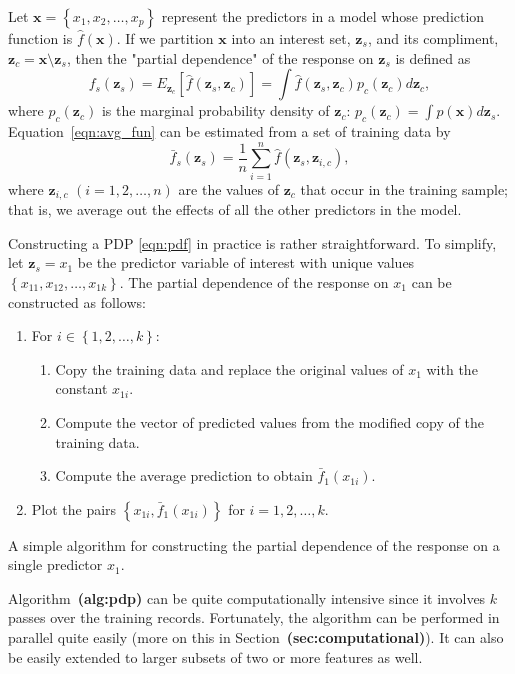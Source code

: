 \documentclass{article}
\def\ref#1{\textbf{(#1)}}
\begin{document}
Let $\boldsymbol{x} = \left\{x_1, x_2, \dots, x_p\right\}$ represent the predictors in a model whose prediction function is $\widehat{f}\left(\boldsymbol{x}\right)$. If we partition $\boldsymbol{x}$ into an interest set, $\boldsymbol{z}_s$, and its compliment, $\boldsymbol{z}_c = \boldsymbol{x} \setminus \boldsymbol{z}_s$, then the "partial dependence" of the response on $\boldsymbol{z}_s$ is defined as
\begin{equation}
\label{eqn:avg_fun}
  f_s\left(\boldsymbol{z}_s\right) = E_{\boldsymbol{z}_c}\left[\widehat{f}\left(\boldsymbol{z}_s, \boldsymbol{z}_c\right)\right] = \int \widehat{f}\left(\boldsymbol{z}_s, \boldsymbol{z}_c\right)p_{c}\left(\boldsymbol{z}_c\right)d\boldsymbol{z}_c,
\end{equation}
where $p_{c}\left(\boldsymbol{z}_c\right)$ is the marginal probability density of $\boldsymbol{z}_c$: $p_{c}\left(\boldsymbol{z}_c\right) = \int p\left(\boldsymbol{x}\right)d\boldsymbol{z}_s$.
Equation~\eqref{eqn:avg_fun} can be estimated from a set of training data by
\begin{equation}
\label{eqn:pdf}
\bar{f}_s\left(\boldsymbol{z}_s\right) = \frac{1}{n}\sum_{i = 1}^n\widehat{f}\left(\boldsymbol{z}_s,\boldsymbol{z}_{i, c}\right),
\end{equation}
where $\boldsymbol{z}_{i, c}$ $\left(i = 1, 2, \dots, n\right)$ are the values of $\boldsymbol{z}_c$ that occur in the training sample; that is, we average out the effects of all the other predictors in the model.

Constructing a PDP \eqref{eqn:pdf} in practice is rather straightforward. To simplify, let $\boldsymbol{z}_s = x_1$ be the predictor variable of interest with unique values $\left\{x_{11}, x_{12}, \dots, x_{1k}\right\}$. The partial dependence of the response on $x_1$ can be constructed as follows:

\begin{algorithm}
\begin{enumerate}
  \item For $i \in \left\{1, 2, \dots, k\right\}$:
  \begin{enumerate}
    \item Copy the training data and replace the original values of $x_1$ with the constant $x_{1i}$.
    \item Compute the vector of predicted values from the modified copy of the training data.
    \item Compute the average prediction to obtain $\bar{f}_1\left(x_{1i}\right)$.
  \end{enumerate}
  \item Plot the pairs $\left\{x_{1i}, \bar{f}_1\left(x_{1i}\right)\right\}$ for $i = 1, 2, \dotsc, k$.
\end{enumerate}
\caption{A simple algorithm for constructing the partial dependence of the response on a single predictor $x_1$. \label{alg:pdp}}
\end{algorithm}
Algorithm~\ref{alg:pdp} can be quite computationally intensive since it involves $k$ passes over the training records. Fortunately, the algorithm can be performed in parallel quite easily (more on this in Section~\ref{sec:computational}). It can also be easily extended to larger subsets of two or more features as well.
\end{document}
